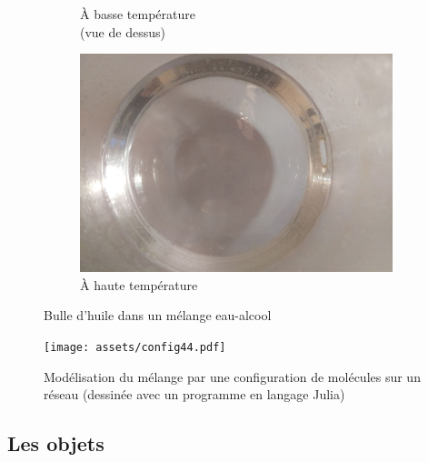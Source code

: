 \documentclass[french]{beamer}
\begin{document}
\begin{frame}
\begin{figure}
\begin{subfigure}{0.32\textwidth}
			\caption{\`A basse température\\(vue de dessus)}
		\end{subfigure}
		\begin{subfigure}{0.32\textwidth}
			\centering
			\includegraphics[height=0.3\textheight]{assets/bulle/IMG_20180612_220259.jpg}
			\caption{\`A haute température\\\phantom{}}
		\end{subfigure}
        \caption{Bulle d'huile dans un mélange eau-alcool}
        \label{fig:miscibilite-bulle}
    \end{figure}
\end{frame}

\frame{\tableofcontents}

\begin{frame}
\begin{figure}
	\centering
	\texttt{[image: assets/config44.pdf]}
	\caption{Modélisation du mélange par une configuration de molécules sur un réseau (dessinée avec un programme en langage Julia)}
\end{figure}
\end{frame}

\subsection{Les objets}
\end{document}
